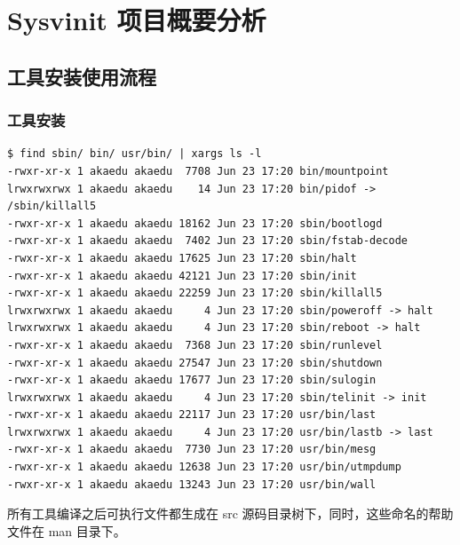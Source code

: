 \chapter{Sysvinit 项目概要分析}

\section{工具安装使用流程}

\subsection{工具安装}

{\begin{shaded}\begin{verbatim}
$ find sbin/ bin/ usr/bin/ | xargs ls -l
-rwxr-xr-x 1 akaedu akaedu  7708 Jun 23 17:20 bin/mountpoint
lrwxrwxrwx 1 akaedu akaedu    14 Jun 23 17:20 bin/pidof -> /sbin/killall5
-rwxr-xr-x 1 akaedu akaedu 18162 Jun 23 17:20 sbin/bootlogd
-rwxr-xr-x 1 akaedu akaedu  7402 Jun 23 17:20 sbin/fstab-decode
-rwxr-xr-x 1 akaedu akaedu 17625 Jun 23 17:20 sbin/halt
-rwxr-xr-x 1 akaedu akaedu 42121 Jun 23 17:20 sbin/init
-rwxr-xr-x 1 akaedu akaedu 22259 Jun 23 17:20 sbin/killall5
lrwxrwxrwx 1 akaedu akaedu     4 Jun 23 17:20 sbin/poweroff -> halt
lrwxrwxrwx 1 akaedu akaedu     4 Jun 23 17:20 sbin/reboot -> halt
-rwxr-xr-x 1 akaedu akaedu  7368 Jun 23 17:20 sbin/runlevel
-rwxr-xr-x 1 akaedu akaedu 27547 Jun 23 17:20 sbin/shutdown
-rwxr-xr-x 1 akaedu akaedu 17677 Jun 23 17:20 sbin/sulogin
lrwxrwxrwx 1 akaedu akaedu     4 Jun 23 17:20 sbin/telinit -> init
-rwxr-xr-x 1 akaedu akaedu 22117 Jun 23 17:20 usr/bin/last
lrwxrwxrwx 1 akaedu akaedu     4 Jun 23 17:20 usr/bin/lastb -> last
-rwxr-xr-x 1 akaedu akaedu  7730 Jun 23 17:20 usr/bin/mesg
-rwxr-xr-x 1 akaedu akaedu 12638 Jun 23 17:20 usr/bin/utmpdump
-rwxr-xr-x 1 akaedu akaedu 13243 Jun 23 17:20 usr/bin/wall
\end{verbatim}\end{shaded}}
所有工具编译之后可执行文件都生成在 src
源码目录树下，同时，这些命名的帮助文件在 man 目录下。

